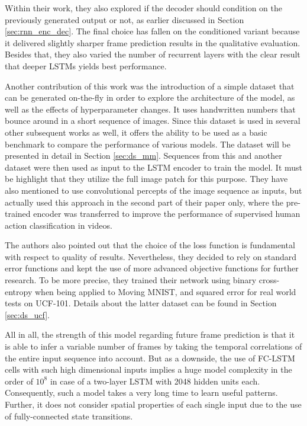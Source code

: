 Within their work, they also explored if the decoder should condition on the previously generated output or not, as earlier discussed in Section \ref{sec:rnn_enc_dec}. The final choice has fallen on the conditioned variant because it delivered slightly sharper frame prediction results in the qualitative evaluation. Besides that, they also varied the number of recurrent layers with the clear result that deeper LSTMs yields best performance.

Another contribution of this work was the introduction of a simple dataset that can be generated on-the-fly in order to explore the architecture of the model, as well as the effects of hyperparameter changes. It uses handwritten numbers that bounce around in a short sequence of images. Since this dataset is used in several other subsequent works as well, it offers the ability to be used as a basic benchmark to compare the performance of various models. The dataset will be presented in detail in Section \ref{sec:ds_mm}. Sequences from this and another dataset were then used as input to the LSTM encoder to train the model. It must be highlight that they utilize the full image patch for this purpose. They have also mentioned to use convolutional percepts of the image sequence as inputs, but actually used this approach in the second part of their paper only, where the pre-trained encoder was transferred to improve the performance of supervised human action classification in videos.

The authors also pointed out that the choice of the loss function is fundamental with respect to quality of results. Nevertheless, they decided to rely on standard error functions and kept the use of more advanced objective functions for further research. To be more precise, they trained their network using binary cross-entropy when being applied to Moving MNIST, and squared error for real world tests on UCF-101. Details about the latter dataset can be found in Section \ref{sec:ds_ucf}.

All in all, the strength of this model regarding future frame prediction is that it is able to infer a variable number of frames by taking the temporal correlations of the entire input sequence into account. But as a downside, the use of FC-LSTM cells with such high dimensional inputs implies a huge model complexity in the order of $10^8$ in case of a two-layer LSTM with \num{2048} hidden units each. Consequently, such a model takes a very long time to learn useful patterns. Further, it does not consider spatial properties of each single input due to the use of fully-connected state transitions.


